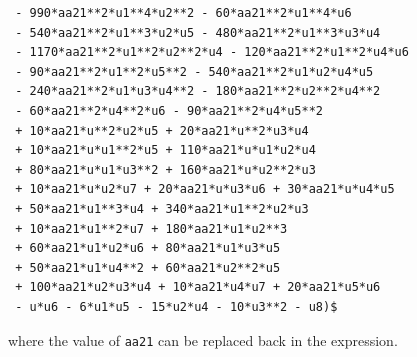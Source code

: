 \begin{verbatim}
 - 990*aa21**2*u1**4*u2**2 - 60*aa21**2*u1**4*u6
 - 540*aa21**2*u1**3*u2*u5 - 480*aa21**2*u1**3*u3*u4
 - 1170*aa21**2*u1**2*u2**2*u4 - 120*aa21**2*u1**2*u4*u6
 - 90*aa21**2*u1**2*u5**2 - 540*aa21**2*u1*u2*u4*u5
 - 240*aa21**2*u1*u3*u4**2 - 180*aa21**2*u2**2*u4**2
 - 60*aa21**2*u4**2*u6 - 90*aa21**2*u4*u5**2
 + 10*aa21*u**2*u2*u5 + 20*aa21*u**2*u3*u4
 + 10*aa21*u*u1**2*u5 + 110*aa21*u*u1*u2*u4
 + 80*aa21*u*u1*u3**2 + 160*aa21*u*u2**2*u3
 + 10*aa21*u*u2*u7 + 20*aa21*u*u3*u6 + 30*aa21*u*u4*u5
 + 50*aa21*u1**3*u4 + 340*aa21*u1**2*u2*u3
 + 10*aa21*u1**2*u7 + 180*aa21*u1*u2**3
 + 60*aa21*u1*u2*u6 + 80*aa21*u1*u3*u5
 + 50*aa21*u1*u4**2 + 60*aa21*u2**2*u5
 + 100*aa21*u2*u3*u4 + 10*aa21*u4*u7 + 20*aa21*u5*u6
 - u*u6 - 6*u1*u5 - 15*u2*u4 - 10*u3**2 - u8)$
\end{verbatim}
where the value of \texttt{aa21} can be replaced back in the expression.
